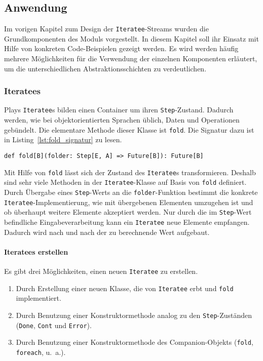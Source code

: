 \documentclass[draft=false
              ,paper=a4
              ,twoside=false
              ,fontsize=11pt
              ,headsepline
              ,BCOR10mm
              ,DIV11
              ]{scrbook}
\begin{document}
\subsection{Anwendung} %
\label{sub:anwendung}

Im vorigen Kapitel zum Design der \lstinline|Iteratee|-Streams wurden die Grundkomponenten des Moduls vorgestellt.
In diesem Kapitel soll ihr Einsatz mit Hilfe von konkreten Code-Beispielen gezeigt werden.
Es wird werden häufig mehrere Möglichkeiten für die Verwendung der einzelnen Komponenten erläutert, um die unterschiedlichen Abstraktionsschichten zu verdeutlichen.


\subsubsection{Iteratees} %
\label{sssec:iteratees}

Plays \lstinline|Iteratee|s bilden einen Container um ihren \lstinline|Step|-Zustand.
Dadurch werden, wie bei objektorientierten Sprachen üblich, Daten und Operationen gebündelt.
Die elementare Methode dieser Klasse ist \lstinline|fold|.
Die Signatur dazu ist in Listing~\ref{lst:fold_signatur} zu lesen.
\begin{lstlisting}[caption=Die Signatur von fold, label=lst:fold_signatur]
def fold[B](folder: Step[E, A] => Future[B]): Future[B]
\end{lstlisting}

Mit Hilfe von \lstinline|fold| lässt sich der Zustand des \lstinline|Iteratee|s transformieren.
Deshalb sind sehr viele Methoden in der \lstinline|Iteratee|-Klasse auf Basis von \lstinline|fold| definiert.
Durch Übergabe eines \lstinline|Step|-Werts an die \lstinline|folder|-Funktion bestimmt die konkrete \lstinline|Iteratee|-Implementierung, wie mit übergebenen Elementen umzugehen ist und ob überhaupt weitere Elemente akzeptiert werden.
Nur durch die im \lstinline|Step|-Wert befindliche Eingabeverarbeitung kann ein \lstinline|Iteratee| neue Elemente empfangen.
Dadurch wird nach und nach der zu berechnende Wert aufgebaut.

\paragraph{Iteratees erstellen} %
\label{par:iteratees_erstellen}\mbox{} %

Es gibt drei Möglichkeiten, einen neuen \lstinline|Iteratee| zu erstellen.
\begin{enumerate}
  \item Durch Erstellung einer neuen Klasse, die von \lstinline|Iteratee| erbt und \lstinline|fold| implementiert.
  \item Durch Benutzung einer Konstruktormethode analog zu den \lstinline|Step|-Zuständen (\lstinline|Done|, \lstinline|Cont| und \lstinline|Error|).
  \item Durch Benutzung einer Konstruktormethode des Companion-Objekts (\lstinline|fold|, \lstinline|foreach|, u.~a.).
\end{enumerate}
\end{document}
